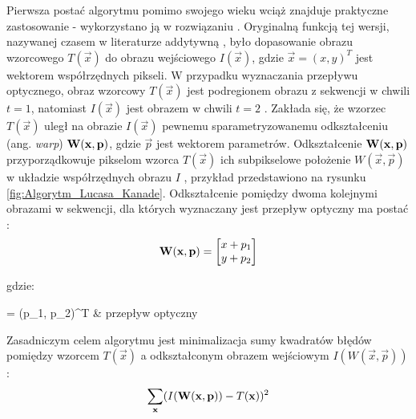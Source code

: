 Pierwsza postać algorytmu pomimo swojego wieku wciąż znajduje praktyczne zastosowanie - wykorzystano ją w rozwiązaniu \cite{Olivares-Mendez2009}. Oryginalną funkcją tej wersji, nazywanej czasem w literaturze addytywną \cite{Baker2004}, było dopasowanie obrazu wzorcowego $T(\vec{x})$ do obrazu wejściowego $I(\vec{x})$, gdzie $\vec{x} = (x, y)^T$ jest wektorem współrzędnych pikseli. W przypadku wyznaczania przepływu optycznego, obraz wzorcowy $T(\vec{x})$ jest podregionem obrazu z sekwencji w chwili $t = 1$, natomiast $I(\vec{x})$ jest obrazem w chwili $t = 2$ \cite{Baker2004}. Zakłada się, że wzorzec $T(\vec{x})$ uległ na obrazie $I(\vec{x})$ pewnemu sparametryzowanemu odkształceniu (ang. \textit{warp}) $\mathbf{W}(\mathbf{x}, \mathbf{p})$, gdzie $\vec{p}$ jest wektorem parametrów. Odkształcenie $\mathbf{W}(\mathbf{x}, \mathbf{p})$ przyporządkowuje pikselom wzorca $T(\vec{x})$ ich subpikselowe położenie $W(\vec{x}, \vec{p})$ w układzie współrzędnych obrazu $I$  \cite{Baker2004}, przykład przedstawiono na rysunku \ref{fig:Algorytm_Lucasa_Kanade}. Odkształcenie pomiędzy dwoma kolejnymi obrazami w sekwencji, dla których wyznaczany jest przepływ optyczny ma postać \cite{Baker2004}:
\begin{equation}
\label{equ:Odksztalcenie_przeplyw_optyczny}
	\mathbf{W}(\mathbf{x}, \mathbf{p}) = \begin{bmatrix}
		x + p_1 \\
		y + p_2 \\
	\end{bmatrix}
\end{equation}

\noindent
gdzie:

\begin{conditions}
	 = (p_1, p_2)^T & przepływ optyczny \\
\end{conditions}

Zasadniczym celem algorytmu jest minimalizacja sumy kwadratów błędów pomiędzy  wzorcem $T(\vec{x})$ a odkształconym obrazem wejściowym $I(W(\vec{x}, \vec{p}))$ \cite{Baker2004}:
\begin{equation}
\label{equ:Algorytm_Lucasa_Kanade_cel}
	\sum\limits_{\mathbf{x}} (I(\mathbf{W}(\mathbf{x}, \mathbf{p})) - T(\mathbf{x}))^2
\end{equation}

